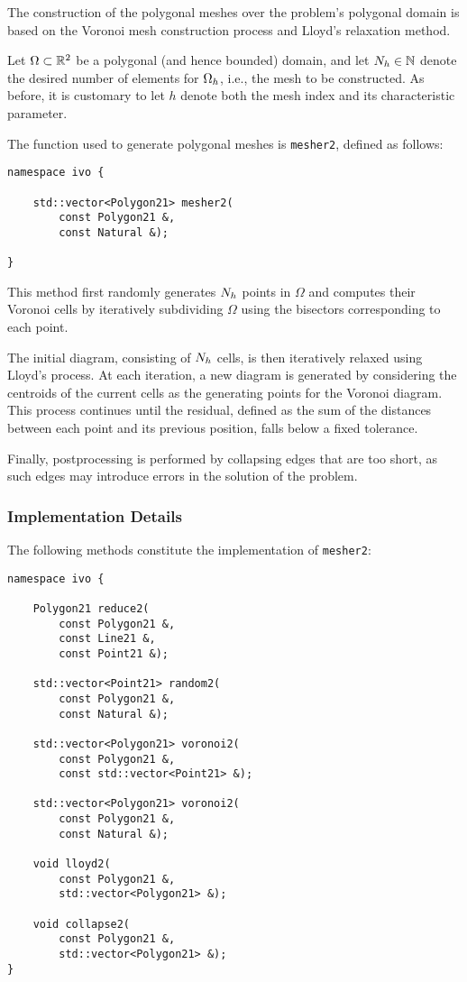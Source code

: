 The construction of the polygonal meshes over the problem's polygonal domain is based on the Voronoi mesh construction process and Lloyd's relaxation method.

Let $\Omega \subset \mathbb{R}^{2}$ be a polygonal (and hence bounded) domain, and let $N_h \in \mathbb{N}$ denote the desired number of elements for $\Omega_{h}$, i.e., the mesh to be constructed. As before, it is customary to let $h$ denote both the mesh index and its characteristic parameter.

The function used to generate polygonal meshes is \lstinline{mesher2}, defined as follows:

\begin{lstlisting}[style=cpp]
namespace ivo {

    std::vector<Polygon21> mesher2(
        const Polygon21 &, 
        const Natural &);

}
\end{lstlisting}

This method first randomly generates $N_h$ points in $\Omega$ and computes their Voronoi cells by iteratively subdividing $\Omega$ using the bisectors corresponding to each point.

The initial diagram, consisting of $N_h$ cells, is then iteratively relaxed using Lloyd's process. At each iteration, a new diagram is generated by considering the centroids of the current cells as the generating points for the Voronoi diagram. This process continues until the residual, defined as the sum of the distances between each point and its previous position, falls below a fixed tolerance.

Finally, postprocessing is performed by collapsing edges that are too short, as such edges may introduce errors in the solution of the problem.

\newpage
\subsubsection{Implementation Details}

The following methods constitute the implementation of \lstinline{mesher2}:

\begin{lstlisting}[style=cpp]
namespace ivo {

	Polygon21 reduce2(
		const Polygon21 &, 
		const Line21 &, 
		const Point21 &);

	std::vector<Point21> random2(
		const Polygon21 &, 
		const Natural &);

	std::vector<Polygon21> voronoi2(
		const Polygon21 &, 
		const std::vector<Point21> &);

	std::vector<Polygon21> voronoi2(
		const Polygon21 &, 
		const Natural &);

	void lloyd2(
		const Polygon21 &, 
		std::vector<Polygon21> &);

	void collapse2(
		const Polygon21 &, 
		std::vector<Polygon21> &);
}
\end{lstlisting}

